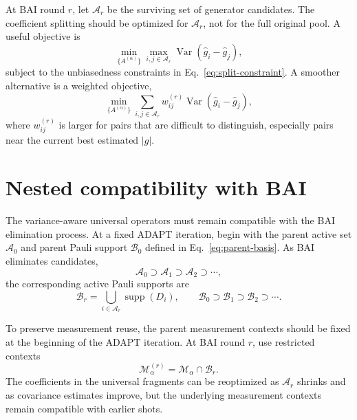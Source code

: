 \documentclass[11pt]{article}
\newcommand{\Var}{\operatorname{Var}}
\newcommand{\supp}{\operatorname{supp}}
\begin{document}
At BAI round $r$, let $\mathcal A_r$ be the surviving set of generator candidates. The coefficient splitting should be optimized for $\mathcal A_r$, not for the full original pool. A useful objective is
\begin{equation}
    \min_{\{A^{(\alpha)}\}}
    \max_{i,j\in\mathcal A_r}
    \Var(\widehat g_i-\widehat g_j),
    \label{eq:minimax-objective}
\end{equation}
subject to the unbiasedness constraints in Eq.~\eqref{eq:split-constraint}. A smoother alternative is a weighted objective,
\begin{equation}
    \min_{\{A^{(\alpha)}\}}
    \sum_{i,j\in\mathcal A_r}w_{ij}^{(r)}
    \Var(\widehat g_i-\widehat g_j),
    \label{eq:weighted-objective}
\end{equation}
where $w_{ij}^{(r)}$ is larger for pairs that are difficult to distinguish, especially pairs near the current best estimated $|g|$.

\section{Nested compatibility with BAI}

The variance-aware universal operators must remain compatible with the BAI elimination process. At a fixed ADAPT iteration, begin with the parent active set $\mathcal A_0$ and parent Pauli support $\mathcal B_0$ defined in Eq.~\eqref{eq:parent-basis}. As BAI eliminates candidates,
\begin{equation}
    \mathcal A_0 \supset \mathcal A_1 \supset \mathcal A_2 \supset \cdots,
\end{equation}
the corresponding active Pauli supports are
\begin{equation}
    \mathcal B_r
    =
    \bigcup_{i\in\mathcal A_r}\supp(D_i),
    \qquad
    \mathcal B_0 \supset \mathcal B_1 \supset \mathcal B_2 \supset \cdots.
\end{equation}

To preserve measurement reuse, the parent measurement contexts should be fixed at the beginning of the ADAPT iteration. At BAI round $r$, use restricted contexts
\begin{equation}
    \mathcal M^{(r)}_\alpha
    =
    \mathcal M_\alpha\cap\mathcal B_r.
\end{equation}
The coefficients in the universal fragments can be reoptimized as $\mathcal A_r$ shrinks and as covariance estimates improve, but the underlying measurement contexts remain compatible with earlier shots.
\end{document}
